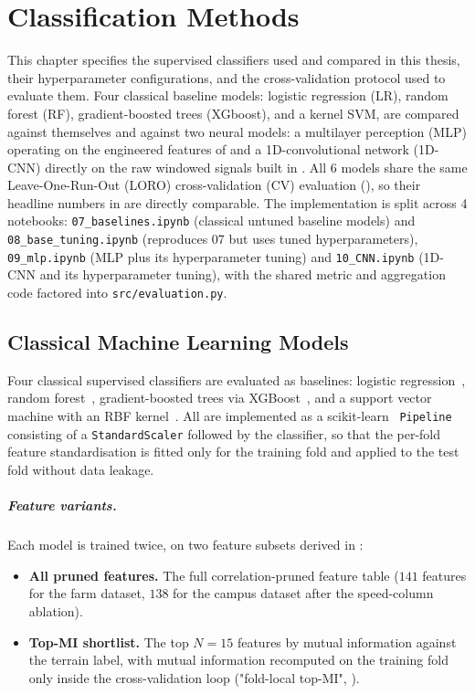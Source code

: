 \chapter{Classification Methods}
\label{ch:classification}

This chapter specifies the supervised classifiers used and compared in this thesis, their hyperparameter configurations, and the cross-validation protocol used to evaluate them. Four classical baseline models: logistic regression (LR), random forest (RF), gradient-boosted trees (XGboost), and a kernel SVM, are compared against themselves and against two neural models: a multilayer perception (MLP) operating on the engineered features of  and a 1D-convolutional network (1D-CNN) directly on the raw windowed signals built in . All 6 models share the same Leave-One-Run-Out (LORO) cross-validation (CV) evaluation (), so their headline numbers in  are directly comparable. The implementation is split across 4 notebooks: \texttt{07\_baselines.ipynb} (classical untuned baseline models) and \texttt{08\_base\_tuning.ipynb} (reproduces 07 but uses tuned hyperparameters), \texttt{09\_mlp.ipynb} (MLP plus its hyperparameter tuning) and \texttt{10\_CNN\allowbreak .ipynb} (1D-CNN and its hyperparameter tuning), with the shared metric and aggregation code factored into \texttt{src/evaluation.py}.

\section{Classical Machine Learning Models}
\label{sec:classical_models}

Four classical supervised classifiers are evaluated as baselines: logistic regression~\cite{Hosmer2013}, random forest~\cite{Breiman2001}, gradient-boosted trees via XGBoost~\cite{Chen2016}, and a support vector machine with an RBF kernel~\cite{Cortes1995}. All are implemented as a scikit-learn~\cite{Pedregosa2011} \texttt{Pipeline}\, consisting of a \texttt{StandardScaler} followed by the classifier, so that the per-fold feature standardisation is fitted only for the training fold and applied to the test fold without data leakage.

\paragraph{Feature variants.}
Each model is trained twice, on two feature subsets derived in :
\begin{itemize}
    \item \textbf{All pruned features.} The full correlation-pruned feature table ($141$ features for the farm dataset, $138$ for the campus dataset after the speed-column ablation).
    \item \textbf{Top-MI shortlist.} The top $N=15$ features by mutual information against the terrain label, with mutual information recomputed on the training fold only inside the cross-validation loop ("fold-local top-MI", ).
\end{itemize}

